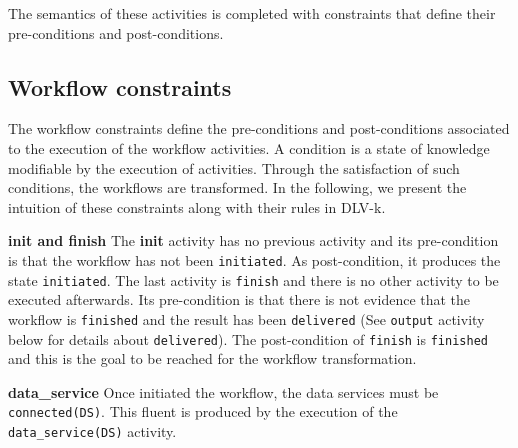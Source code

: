 %


\vspace*{0.25cm}			   
The semantics of these activities is completed with constraints that define their pre-conditions and post-conditions.
				
\subsection{Workflow constraints} 
The workflow constraints define the pre-conditions and post-conditions associated to the execution of the workflow activities. A condition is a state of knowledge modifiable by the execution of activities. Through the satisfaction of such conditions, the workflows are transformed.
In the following, we present the intuition of these constraints along with their rules in DLV-k.

\vspace*{0.25cm}              
\noindent\textbf{init and finish} The \textbf{init} activity has no previous activity and its pre-condition is that the workflow has not been \texttt{initiated}. As post-condition, it produces the state \texttt{initiated}. The last activity is \texttt{finish} and there is no other activity to be executed afterwards. Its pre-condition is that there is not evidence that the workflow is \texttt{finished} and the result has been \texttt{delivered} (See \texttt{output} activity below for details about \texttt{delivered}). The post-condition of \texttt{finish} is \texttt{finished} and this is the goal to be reached for the workflow transformation.
                            
%


\vspace*{0.25cm}        
\textbf{data\_service} Once initiated the workflow, the data services must be \texttt{connected(DS)}. This fluent is produced by the execution of the \texttt{data\_service(DS)} activity. 

%

